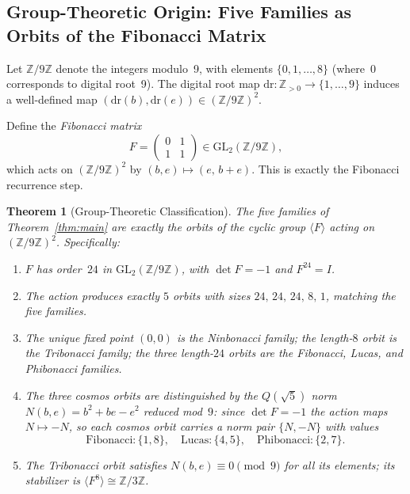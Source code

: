 \documentclass[12pt]{article}
\newtheorem{theorem}{Theorem}
\begin{document}
\subsection{Group-Theoretic Origin: Five Families as Orbits of the Fibonacci Matrix}

Let $\mathbb{Z}/9\mathbb{Z}$ denote the integers modulo~9, with elements $\{0,1,\ldots,8\}$ (where~$0$ corresponds to digital root~9).  The digital root map $\mathrm{dr}:\mathbb{Z}_{>0}\to\{1,\ldots,9\}$ induces a well-defined map $(\mathrm{dr}(b),\mathrm{dr}(e))\in(\mathbb{Z}/9\mathbb{Z})^2$.

Define the \emph{Fibonacci matrix}
\[
  F = \begin{pmatrix} 0 & 1 \\ 1 & 1 \end{pmatrix} \in \mathrm{GL}_2(\mathbb{Z}/9\mathbb{Z}),
\]
which acts on $(\mathbb{Z}/9\mathbb{Z})^2$ by $(b,e)\mapsto (e,\, b+e)$.  This is exactly the Fibonacci recurrence step.

\begin{theorem}[Group-Theoretic Classification]\label{thm:orbits}
The five families of Theorem~\ref{thm:main} are exactly the orbits of the cyclic group $\langle F\rangle$ acting on $(\mathbb{Z}/9\mathbb{Z})^2$.  Specifically:
\begin{enumerate}
\item $F$ has order~$24$ in $\mathrm{GL}_2(\mathbb{Z}/9\mathbb{Z})$, with $\det F = -1$ and $F^{24} = I$.
\item The action produces exactly $5$ orbits with sizes $24,\,24,\,24,\,8,\,1$, matching the five families.
\item The unique fixed point $(0,0)$ is the Ninbonacci family; the length-$8$ orbit is the Tribonacci family; the three length-$24$ orbits are the Fibonacci, Lucas, and Phibonacci families.
\item The three cosmos orbits are distinguished by the \emph{$Q(\sqrt{5})$ norm} $N(b,e)=b^2+be-e^2$ reduced mod~$9$: since $\det F=-1$ the action maps $N\mapsto -N$, so each cosmos orbit carries a norm pair $\{N,-N\}$ with values
\[
  \text{Fibonacci}: \{1,8\},\quad \text{Lucas}: \{4,5\},\quad \text{Phibonacci}: \{2,7\}.
\]
\item The Tribonacci orbit satisfies $N(b,e)\equiv 0\pmod{9}$ for all its elements; its stabilizer is $\langle F^8\rangle\cong\mathbb{Z}/3\mathbb{Z}$.
\end{enumerate}
\end{theorem}
\end{document}
